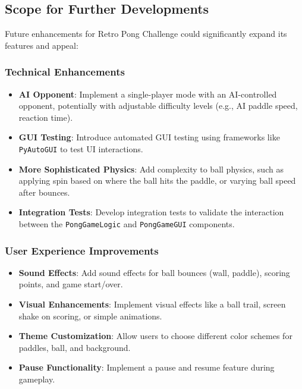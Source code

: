 \documentclass[12pt,a4paper]{article}
\begin{document}
\subsection{Scope for Further Developments}
Future enhancements for Retro Pong Challenge could significantly expand its features and appeal:

\subsubsection{Technical Enhancements}
\begin{itemize}
    \item \textbf{AI Opponent}: Implement a single-player mode with an AI-controlled opponent, potentially with adjustable difficulty levels (e.g., AI paddle speed, reaction time).
    \item \textbf{GUI Testing}: Introduce automated GUI testing using frameworks like \texttt{PyAutoGUI} to test UI interactions.
    \item \textbf{More Sophisticated Physics}: Add complexity to ball physics, such as applying spin based on where the ball hits the paddle, or varying ball speed after bounces.
    \item \textbf{Integration Tests}: Develop integration tests to validate the interaction between the \texttt{PongGameLogic} and \texttt{PongGameGUI} components.
\end{itemize}

\subsubsection{User Experience Improvements}
\begin{itemize}
    \item \textbf{Sound Effects}: Add sound effects for ball bounces (wall, paddle), scoring points, and game start/over.
    \item \textbf{Visual Enhancements}: Implement visual effects like a ball trail, screen shake on scoring, or simple animations.
    \item \textbf{Theme Customization}: Allow users to choose different color schemes for paddles, ball, and background.
    \item \textbf{Pause Functionality}: Implement a pause and resume feature during gameplay.
\end{itemize}
\end{document}
